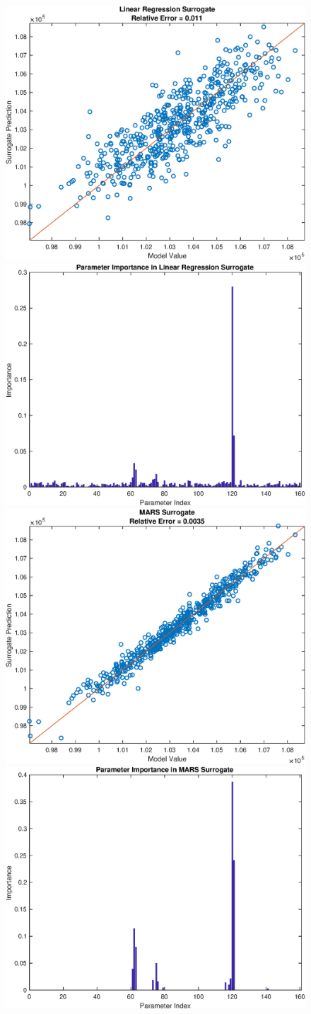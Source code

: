 \documentclass[12pt]{article}
\numberwithin{equation}{section}
\begin{document}
\begin{figure}[h]
\centering
\includegraphics[width=.49 \textwidth]{Figures/K_AC_Mean_QoI_LR_Prediction_Experimental.eps}
\includegraphics[width=.49 \textwidth]{Figures/K_AC_Mean_QoI_LR_VI_Experimental.eps}\\
\includegraphics[width=.49 \textwidth]{Figures/K_AC_Mean_QoI_MARS_Prediction_Experimental.eps}
\includegraphics[width=.49 \textwidth]{Figures/K_AC_Mean_QoI_MARS_VI_Experimental.eps}
\end{figure}
\end{document}
